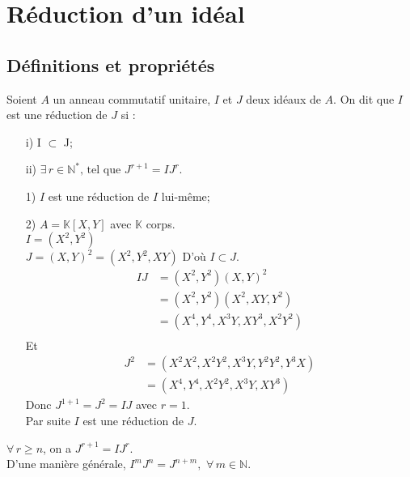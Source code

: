 \section{Réduction d'un idéal}
\subsection{Définitions et propriétés}
\begin{madefinition}
	Soient $A$ un anneau commutatif unitaire, $I$ et $J$ deux id\'eaux de $A$.
	On dit que $I$ est une réduction de $J$ si :\\
	\begin{enumerate}
		\item[i)] I $\subset$ J;
		\item[ii)] $\exists \, r\in \mathbb{N}^{*} \text{, tel que } J^{r+1} = IJ^{r}$.
	\end{enumerate}
\end{madefinition}
\begin{monexemple}
	\begin{enumerate}
		\item[1)] $I$ est une réduction de $I$ lui-même;
		\item[2)] $A =\mathbb{K}[X,Y]$ avec $\mathbb{K}$ corps.\\
		$I = (X^2, Y^2)$\\
		$J = (X,Y)^2 = (X^2, Y^2, XY) $ D'où $I \subset J$.
		\begin{align*}
			IJ&= (X^{2},Y^{2})(X,Y)^{2}\\
			&= (X^{2},Y^{2})(X^{2},XY,Y^{2})\\
			&= (X^{4},Y^{4},X^{3}Y,XY^{3},X^{2}Y^{2})\\
		\end{align*}
		Et \\ 
		\begin{align*}
			J^2 &= (X^2X^2, X^2Y^2, X^3Y, Y^2Y^2, Y^3X)\\
			&= (X^4, Y^4, X^2Y^2, X^3Y, XY^3)
		\end{align*}
		Donc $J^{1+1} = J^2 = IJ $ avec $r=1$.\\
		Par suite $I$ est une réduction de $J$.
	\end{enumerate}
\end{monexemple}
\begin{maremarque}
	$\forall \, r\geq n$, on a $J^{r+1} = IJ^{r}$.\\
	D'une manière générale, $I^{m}J^{n}=J^{n+m}, \, \, \forall \, m\in \mathbb{N}$.	
\end{maremarque}


